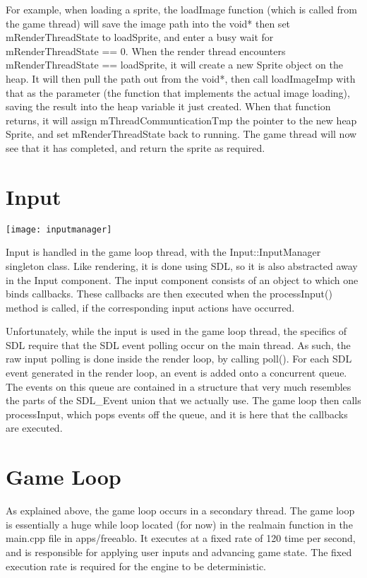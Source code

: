     For example, when loading a sprite, the loadImage function (which is called from the game thread) will save the image path into the void* then set mRenderThreadState to loadSprite, and enter a busy wait for mRenderThreadState == 0.
    When the render thread encounters mRenderThreadState == loadSprite, it will create a new Sprite object on the heap. It will then pull the path out from  the void*, then call loadImageImp with that as the parameter (the function that implements the actual image loading), saving the result into the heap variable it just created.
    When that function returns, it will assign mThreadCommunticationTmp the pointer to the new heap Sprite, and set mRenderThreadState back to running.
    The game thread will now see that it has completed, and return the sprite as required.
        
    \section{Input}
    
    \begin{center}\texttt{[image: inputmanager]}\end{center}
    Input is handled in the game loop thread, with the Input::InputManager singleton class. Like rendering, it is done using SDL, so it is also abstracted away in the Input component.
    The input component consists of an object to which one binds callbacks. These callbacks are then executed when the processInput() method is called, if the corresponding input actions have occurred.
  	
  	Unfortunately, while the input is used in the game loop thread, the specifics of SDL require that the SDL event polling occur on the main thread. As such, the raw input polling is done inside the render loop, by calling poll(). 
  	For each SDL event generated in the render loop, an event is added onto a concurrent queue. The events on this queue are contained in a structure that very much resembles the parts of the SDL\_Event union that we actually use.
  	The game loop then calls processInput, which pops events off the queue, and it is here that the callbacks are executed.

\section{Game Loop}
	As explained above, the game loop occurs in a secondary thread. The game loop is essentially a huge while loop  located (for now) in the realmain function in the main.cpp file in apps/freeablo.
	It executes at a fixed rate of 120 time per second, and is responsible for applying user inputs and advancing game state. The fixed execution rate is required for the engine to be deterministic.
	
